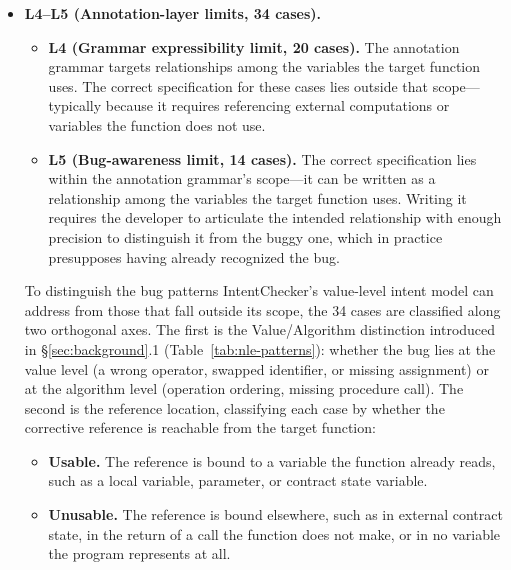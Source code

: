 \documentclass[pdflatex,sn-basic]{sn-jnl}%
\theoremstyle{thmstyleone}%
\theoremstyle{thmstyletwo}%
\theoremstyle{thmstylethree}%
\begin{document}
\begin{itemize}
  \item \textbf{L4--L5 (Annotation-layer limits, 34 cases).}
  \begin{itemize}
    \item \textbf{L4 (Grammar expressibility limit, 20 cases).} The annotation grammar targets relationships among the variables the target function uses. The correct specification for these cases lies outside that scope---typically because it requires referencing external computations or variables the function does not use.
    \item \textbf{L5 (Bug-awareness limit, 14 cases).} The correct specification lies within the annotation grammar's scope---it can be written as a relationship among the variables the target function uses. Writing it requires the developer to articulate the intended relationship with enough precision to distinguish it from the buggy one, which in practice presupposes having already recognized the bug.
  \end{itemize}

  \noindent To distinguish the bug patterns IntentChecker's value-level intent model can address from those that fall outside its scope, the 34 cases are classified along two orthogonal axes. The first is the Value/Algorithm distinction introduced in §\ref{sec:background}.1 (Table~\ref{tab:nle-patterns}): whether the bug lies at the value level (a wrong operator, swapped identifier, or missing assignment) or at the algorithm level (operation ordering, missing procedure call). The second is the reference location, classifying each case by whether the corrective reference is reachable from the target function:
  \begin{itemize}
    \item \textbf{Usable.} The reference is bound to a variable the function already reads, such as a local variable, parameter, or contract state variable.
    \item \textbf{Unusable.} The reference is bound elsewhere, such as in external contract state, in the return of a call the function does not make, or in no variable the program represents at all.
  \end{itemize}


\end{itemize}
\end{document}
